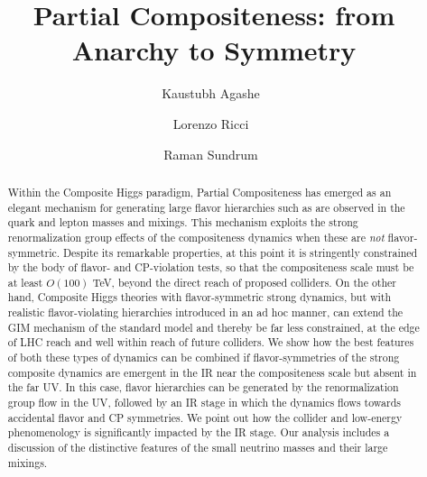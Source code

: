 \documentclass[aps,prl,twocolumn,showpacs,10pt,preprintnumbers,nofootinbib]{revtex4-2}
\begin{document}
\title{Partial Compositeness: from Anarchy to Symmetry}



\author{Kaustubh Agashe~}
\author{Lorenzo Ricci~}
\author{Raman Sundrum~}

\begin{abstract}
\noindent 
Within the Composite Higgs paradigm, Partial Compositeness has emerged as an elegant mechanism for generating large flavor hierarchies such as are observed in the quark and lepton masses and mixings. This mechanism exploits the strong renormalization group effects of  the compositeness dynamics when these are {\it not} flavor-symmetric. Despite its remarkable properties, at this point it is stringently constrained  by the body of  flavor- and CP-violation tests, so that the compositeness scale must be at least $O(100)$ TeV, beyond the direct reach of proposed colliders. On the other hand, Composite Higgs theories with flavor-symmetric strong dynamics, but with realistic flavor-violating hierarchies introduced in an ad hoc manner, can extend the GIM mechanism of the standard model and thereby be far less constrained, at the edge of LHC reach and well within reach of future colliders. 
We show how the best features of both these types of dynamics can be combined if flavor-symmetries of the strong composite dynamics are emergent in the IR near the compositeness scale but absent in the far UV. In this case, flavor hierarchies can be generated by the renormalization group flow in the UV, 
 followed by an IR stage in which the dynamics flows towards accidental flavor and CP symmetries. 
  We point out how the  collider and low-energy phenomenology is significantly impacted by the IR stage. 
 Our analysis includes a discussion of the distinctive features of the small neutrino masses and their large mixings. 
\end{abstract}



\maketitle
\end{document}
